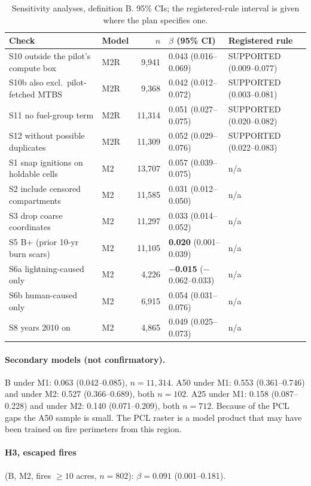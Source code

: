 \documentclass[11pt]{article}
\begin{document}
\begin{table}[h]\centering\footnotesize
\caption{Sensitivity analyses, definition B. 95\% CIs; the registered-rule interval is given where the plan specifies one.}
\label{tab:sens}
\begin{tabular}{llrll}\toprule
Check & Model & $n$ & $\beta$ (95\% CI) & Registered rule \\\midrule
S10 outside the pilot's compute box & M2R & 9{,}941 & 0.043 (0.016--0.069) & SUPPORTED (0.009--0.077)\\
S10b also excl.\ pilot-fetched MTBS & M2R & 9{,}368 & 0.042 (0.012--0.072) & SUPPORTED (0.003--0.081)\\
S11 no fuel-group term & M2R & 11{,}314 & 0.051 (0.027--0.075) & SUPPORTED (0.020--0.082)\\
S12 without possible duplicates & M2R & 11{,}309 & 0.052 (0.029--0.076) & SUPPORTED (0.022--0.083)\\
S1 snap ignitions on holdable cells & M2 & 13{,}707 & 0.057 (0.039--0.075) & n/a\\
S2 include censored compartments & M2 & 11{,}585 & 0.031 (0.012--0.050) & n/a\\
S3 drop coarse coordinates & M2 & 11{,}297 & 0.033 (0.014--0.052) & n/a\\
S5 B+ (prior 10-yr burn scars) & M2 & 11{,}105 & \textbf{0.020} (0.001--0.039) & n/a\\
S6a lightning-caused only & M2 & 4{,}226 & \textbf{$-$0.015} ($-$0.062--0.033) & n/a\\
S6b human-caused only & M2 & 6{,}915 & 0.054 (0.031--0.076) & n/a\\
S8 years 2010 on & M2 & 4{,}865 & 0.049 (0.025--0.073) & n/a\\
\bottomrule\end{tabular}\end{table}

\paragraph{Secondary models (not confirmatory).}
B under M1: 0.063 (0.042--0.085), $n=11{,}314$. A50 under M1: 0.553 (0.361--0.746) and under M2: 0.527 (0.366--0.689), both $n=102$.
A25 under M1: 0.158 (0.087--0.228) and under M2: 0.140 (0.071--0.209), both $n=712$. Because of the PCL gaps the A50 sample is small. The PCL raster is a
model product that may have been trained on fire perimeters from this region.

\paragraph{H3, escaped fires} (B, M2, fires $\ge10$ acres, $n=802$): $\beta=0.091$ (0.001--0.181).
\end{document}
